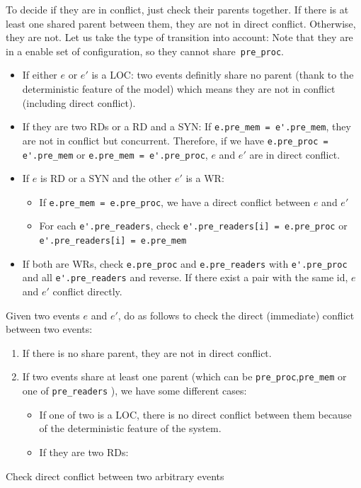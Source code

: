 \documentclass{llncs}
\begin{document}
\begin{enumerate}
		To decide if they are in conflict, just check their parents together. If there is at least one
		shared parent between them, they are not in direct conflict. Otherwise, they are not. Let us take
		the type of transition into account: 
		Note that they are in a enable set of configuration, so they cannot share\verb!	pre_proc!.
		\begin{itemize}
			\item
				If either $e$ or $e'$ is a LOC: two events definitly share no parent (thank to the
				deterministic feature of the model) which means they are not in conflict 
				(including direct conflict).
			\item
				If they are two RDs or a RD and a SYN: If \verb!e.pre_mem = e'.pre_mem!, they are not in
				conflict but concurrent. Therefore, if we have \verb!e.pre_proc = e'.pre_mem! or
				\verb!e.pre_mem = e'.pre_proc!, $e$ and $e'$ are in direct conflict.
			\item
				If $e$ is RD or a SYN and the other $e'$ is a WR: 
				\begin{itemize}
					\item
						If \verb!e.pre_mem = e.pre_proc!, we have a direct conflict between $e$ and $e'$
					\item
						For each \verb!e'.pre_readers!, check \verb!e'.pre_readers[i] = e.pre_proc! or
						 \verb!e'.pre_readers[i] = e.pre_mem!
				\end{itemize}
				
			\item
				If both are WRs, check \verb!e.pre_proc! and \verb!e.pre_readers! with \verb!e'.pre_proc!
				and all \verb!e'.pre_readers! and reverse. If there exist a pair with the same id, $e$ and
				$e'$ conflict directly.
		\end{itemize}

		\begin{algorithm}{}
			Given two events $e$ and $e'$, do as follows to check the direct (immediate) conflict between
			two events:
			\begin{enumerate}
				\item
					If there is no share parent, they are not in direct conflict.
				\item
					If two events share at least one parent (which can be \verb!pre_proc!,\verb!pre_mem! or
					one of \verb!pre_readers! ), we have some different cases:
					\begin{itemize}
						\item
							If one of two is a LOC, there is no direct conflict between them because of the 								deterministic feature of the system.
						\item
							If they are two RDs: 
					\end{itemize}
			\end{enumerate}
			\noindent
			\caption{Check direct conflict between two arbitrary events}
			\label{a:dicfl}
		\end{algorithm}


\end{enumerate}
\end{document}
